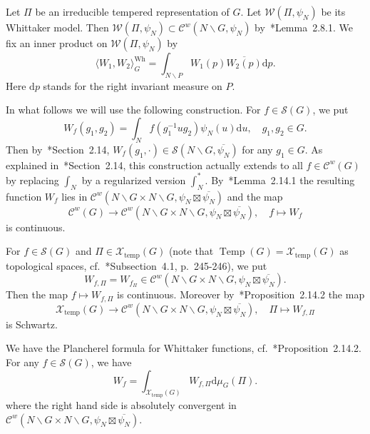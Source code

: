 \documentclass[letterpaper,11pt]{amsart}
\newcommand{\cC}{\mathcal{C}}
\newcommand{\cS}{\mathcal{S}}
\newcommand{\cW}{\mathcal{W}}
\newcommand{\cX}{\mathcal{X}}
\newcommand{\rd}{\mathrm{d}}
\newcommand{\bs}{\backslash}
\newcommand{\<}{\negthickspace}
\DeclareMathOperator{\Temp}{Temp} \DeclareMathOperator{\temp}{temp}
\theoremstyle{definition}
\theoremstyle{plain}
\theoremstyle{remark}
\numberwithin{equation}{section}
\begin{document}
Let $\Pi$ be an irreducible tempered representation of $G$. Let $\cW(\Pi,
\psi_{N})$ be its Whittaker model. Then $\cW(\Pi, \psi_{N}) \subset \cC^w(N
\bs G, \psi_{N})$ by~\cite{BP1}*{Lemma~2.8.1}. We fix an inner product on
$\cW(\Pi, \psi_{N})$ by
    \begin{equation}    \label{eq:whittaker_inner_product_local}
    \langle W_1, W_2 \rangle^{\mathrm{Wh}}_{G} =
    \int_{N \bs P} W_1(p) \overline{W_2(p)} \rd p.
    \end{equation}
Here $\rd p$ stands for the right invariant measure on $P$.


In what follows we will use the following construction. For $f \in \cS(G)$,
we put
    \begin{equation}    \label{eq:definition_W_phi}
    W_{f}(g_1, g_2) = \int_{N}
    f(g_1^{-1} u g_2) \psi_{N}(u) \rd u, \quad g_1, g_2 \in G.
    \end{equation}
Then by~\cite{BP1}*{Section~2.14}, $W_{f}(g_1, \cdot) \in \cS(N \bs G,
\overline{\psi_{N}})$ for any $g_1 \in G$. As explained
in~\cite{BP1}*{Section~2.14}, this construction actually extends to all $f
\in \cC^w(G)$ by replacing $\int_{N}$ by a regularized version $\int^*_{N}$.
By~\cite{BP1}*{Lemma~2.14.1} the resulting function $W_{f}$ lies in
$\cC^w(N\bs G \times N \bs G, \psi_{N} \boxtimes \overline{\psi_{N}})$ and
the map
    \[
    \cC^w(G) \to \cC^w(N \bs G \times N \bs G,
    \psi_{N} \boxtimes \overline{\psi_{N}}), \quad f \mapsto W_{f}
    \]
is continuous.



For $f \in \cS(G)$ and $\Pi \in \cX_{\temp}(G)$ (note that $\Temp(G) =
\cX_{\temp}(G)$ as topological spaces, cf.~\cite{BP1}*{Subsection~4.1,
p.~245-246}), we put
    \begin{equation}    \label{eq:W_f_Pi}
    W_{f, \Pi} = W_{f_{\Pi}} \in
    \cC^w(N \bs G \times N \bs G,
    \psi_{N} \boxtimes \overline{\psi_{N}}).
    \end{equation}
Then the map $f \mapsto W_{f, \Pi}$ is continuous. Moreover
by~\cite{BP1}*{Proposition~2.14.2} the map
    \[
    \cX_{\temp}(G) \to \cC^w(N
    \bs G \times N \bs G, \psi_{N} \boxtimes \overline{\psi_{N}}),
    \quad
    \Pi \mapsto W_{f, \Pi}
    \]
is Schwartz.

We have the Plancherel formula for Whittaker functions,
cf.~\cite{BP1}*{Proposition~2.14.2}. For any $f \in \cS(G)$, we have
    \begin{equation}    \label{eq:Plancherel_Whittaker}
    W_{f} = \int_{\cX_{\temp}(G)} W_{f, \Pi} \rd \mu_{G}(\Pi).
    \end{equation}
where the right hand side is absolutely convergent in $\cC^w(N \bs G \times N
\bs G, \psi_{N} \boxtimes \overline{\psi_{N}})$.
\end{document}
